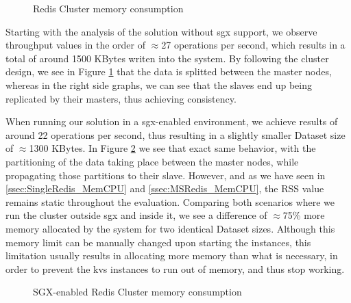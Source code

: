 \begin{figure}[htbp]
	\centering
	\caption{Redis Cluster memory consumption}
	\label{fig:noSgxMemoryConsumption_Cluster}
\end{figure}

Starting with the analysis of the solution without \gls{sgx} support, we observe throughput values in the order of $\approx$27 operations per second, which results in a total of around 1500 KBytes writen into the system. By following the cluster design, we see in Figure \ref{fig:noSgxMemoryConsumption_Cluster} that the data is splitted between the master nodes, whereas in the right side graphs, we can see that the slaves end up being replicated by their masters, thus achieving consistency. 

When running our solution in a \gls{sgx}-enabled environment, we achieve results of around 22 operations per second, thus resulting in a slightly smaller Dataset size of $\approx$1300 KBytes. In Figure \ref{fig:sgxMemoryConsumption_Cluster} we see that exact same behavior, with the partitioning of the data taking place between the master nodes, while propagating those partitions to their slave. 
However, and as we have seen in \ref{ssec:SingleRedis_MemCPU} and \ref{ssec:MSRedis_MemCPU}, the RSS value remains static throughout the evaluation. 
Comparing both scenarios where we run the cluster outside \gls{sgx} and inside it, we see a difference of $\approx$75\% more memory allocated by the system for two identical Dataset sizes. Although this memory limit can be manually changed upon starting the instances, this limitation usually results in allocating more memory than what is necessary, in order to prevent the \gls{kvs} instances to run out of memory, and thus stop working.

\vspace{5mm}

\begin{figure}[htbp]
	\centering
	\caption{SGX-enabled Redis Cluster memory consumption}
	\label{fig:sgxMemoryConsumption_Cluster}
\end{figure}


